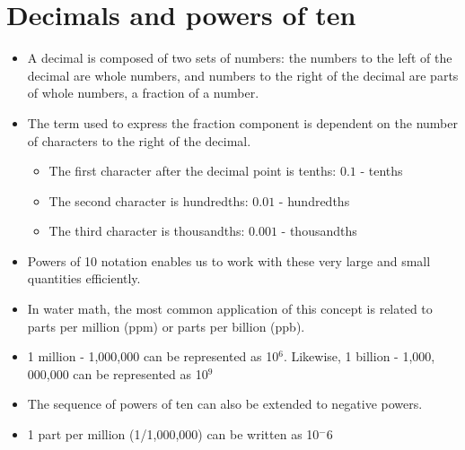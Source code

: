 \section{Decimals and powers of ten}
\begin{itemize}
\item A decimal is composed of two sets of numbers: the numbers to the left of the decimal are whole numbers, and numbers to the right of the decimal are parts of whole numbers, a fraction of a number.\\

\item The term used to express the fraction component is dependent on the number of characters to the right of the decimal.

\begin{itemize}
  \item The first character after the decimal point is tenths: $0.1$ - tenths

  \item The second character is hundredths: $0.01$ - hundredths

  \item The third character is thousandths: $0.001$ - thousandths
\end{itemize}

\item Powers of 10 notation enables us to work with these very large and small quantities efficiently.
\item In water math, the most common application of this concept is related to parts per million (ppm) or parts per billion (ppb).
\item 1 million - 1,000,000 can be represented as 10$^6$.  Likewise, 1 billion - 1,000, 000,000 can be represented as 10$^9$
\item The sequence of powers of ten can also be extended to negative powers.
\item 1 part per million (1/1,000,000) can be written as 10$^-6$
\end{itemize}



